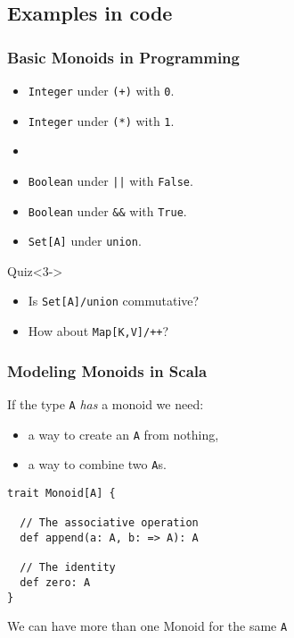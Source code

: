 \documentclass{beamer}
\begin{document}
\subsection{Examples in code}

\begin{frame}\frametitle{Basic Monoids in Programming}
  \begin{itemize}
    \item<1-> \texttt{Integer} under \texttt{(+)} with \texttt{0}.
    \item<1-> \texttt{Integer} under \texttt{(*)} with \texttt{1}.
    \item{}
    \item<3-> \texttt{Boolean} under \texttt{||} with \texttt{False}.
    \item<3-> \texttt{Boolean} under \texttt{\&\&} with \texttt{True}.
    \item<3-> \texttt{Set[A]} under \texttt{union}.
  \end{itemize}

  \begin{block}{Quiz}<3->
    \begin{itemize}
    \item Is \texttt{Set[A]/union} commutative?
    \item How about \texttt{Map[K,V]/++}?
    \end{itemize}
  \end{block}
  \end{frame}

\begin{frame}[fragile]\frametitle{Modeling Monoids in Scala}
  If the type \texttt{A} \emph{has} a monoid we need:
  \begin{itemize}
    \item a way to create an \texttt{A} from nothing,
    \item a way to combine two \texttt{A}s.
  \end{itemize}

  \begin{block}{}
  \begin{lstlisting}
trait Monoid[A] {

  // The associative operation
  def append(a: A, b: => A): A

  // The identity
  def zero: A
}
  \end{lstlisting}
  \end{block}

  We can have more than one Monoid for the same \texttt{A}
\end{frame}
\end{document}
